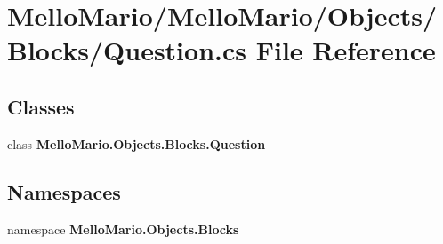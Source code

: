 \section{Mello\+Mario/\+Mello\+Mario/\+Objects/\+Blocks/\+Question.cs File Reference}
\label{Question_8cs}
\subsection*{Classes}
\begin{DoxyCompactItemize}
\item 
class \textbf{ Mello\+Mario.\+Objects.\+Blocks.\+Question}
\end{DoxyCompactItemize}
\subsection*{Namespaces}
\begin{DoxyCompactItemize}
\item 
namespace \textbf{ Mello\+Mario.\+Objects.\+Blocks}
\end{DoxyCompactItemize}
